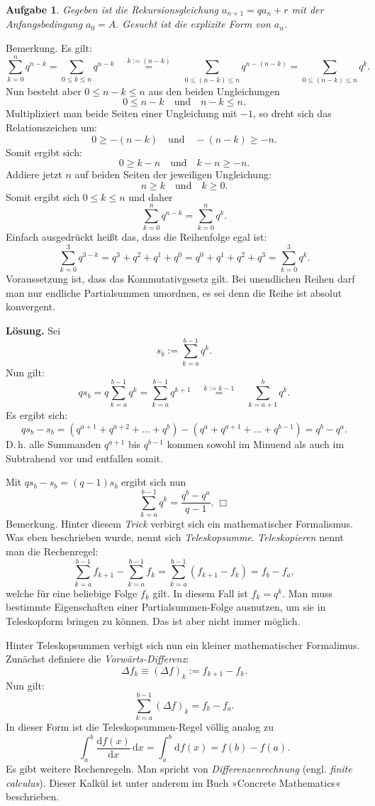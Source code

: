 \documentclass[a4paper,10pt,fleqn,twoside]{scrartcl}
\numberwithin{equation}{section}
\newcommand{\strong}[1]{{\sf\bfseries #1}}
\theoremstyle{Aufgabe}
\newtheorem{Aufgabe}{\sffamily Aufgabe}[section]
\begin{document}
\begin{Aufgabe}
Gegeben ist die Rekursionsgleichung
$a_{n+1} = qa_n+r$
mit der Anfangsbedingung
$a_0=A.$
Gesucht ist die explizite Form von $a_n$.
\end{Aufgabe}

\noindent
Bemerkung. Es gilt:
\[\sum_{k=0}^n q^{n-k} = \sum_{0\le k\le n} q^{n-k}
\quad\stackrel{k:=(n-k)}=\quad\sum_{0\le (n-k)\le n} q^{n-(n-k)}
= \sum_{0\le (n-k)\le n} q^k.
\]
Nun besteht aber $0\le n-k\le n$ aus den beiden Ungleichungen
\[0\le n-k\quad\text{und}\quad n-k\le n.\]
Multipliziert man beide Seiten einer Ungleichung mit $-1$, so dreht
sich das Relationszeichen um:
\[0\ge -(n-k)\quad\text{und}\quad -(n-k)\ge -n.\]
Somit ergibt sich:
\[0\ge k-n\quad\text{und}\quad k-n\ge -n.\]
Addiere jetzt $n$ auf beiden Seiten der jeweiligen Ungleichung:
\[n\ge k\quad\text{und}\quad k\ge 0.\]
Somit ergibt sich $0\le k\le n$ und daher
\[\sum_{k=0}^n q^{n-k} = \sum_{k=0}^n q^k.\]
Einfach ausgedrückt heißt das, dass die Reihenfolge egal ist:
\[\sum_{k=0}^3 q^{3-k} = q^3+q^2+q^1+q^0 = q^0+q^1+q^2+q^3 = \sum_{k=0}^3 q^k.\]
Voraussetzung ist, dass das Kommutativgesetz gilt. Bei unendlichen
Reihen darf man nur endliche Partialsummen umordnen, es sei denn
die Reihe ist absolut konvergent.

\strong{Lösung.} Sei
\[s_b := \sum_{k=a}^{b-1} q^k.\]
Nun gilt:
\[qs_b = q\sum_{k=a}^{b-1} q^k = \sum_{k=a}^{b-1} q^{k+1}
\quad\stackrel{k:=k-1}=\quad\sum_{k=a+1}^b q^k.\]
Es ergibt sich:
\[qs_b-s_b = (q^{a+1}+q^{a+2}+\ldots+q^{b})-(q^a+q^{a+1}+\ldots+q^{b-1}) = q^b-q^a.\]
D.\,h. alle Summanden $q^{a+1}$ bis $q^{b-1}$ kommen sowohl im Minuend als auch im Subtrahend vor und
entfallen somit.

Mit $qs_b-s_b=(q-1)s_b$ ergibt sich nun
\[\sum_{k=a}^{b-1} q^k = \frac{q^b-q^a}{q-1}.\;\Box\]
Bemerkung. Hinter diesem \emph{Trick} verbirgt sich ein mathematischer
Formalismus. Was eben beschrieben wurde, nennt sich
\emph{Teleskopsumme}. \emph{Teleskopieren} nennt man die Rechenregel:
\[\sum_{k=a}^{b-1} f_{k+1} - \sum_{k=a}^{b-1} f_k
= \sum_{k=a}^{b-1} (f_{k+1}-f_k) = f_b-f_a,\]
welche für eine beliebige Folge $f_k$ gilt. In diesem Fall ist
$f_k=q^k$. Man muss bestimmte Eigenschaften einer Partialsummen-Folge
ausnutzen, um sie in Teleskopform bringen zu können. Das ist aber nicht
immer möglich.

Hinter Teleskopsummen verbigt sich nun ein kleiner mathematischer
Formalimus. Zunächst definiere die \emph{Vorwärts-Differenz}:
\[\Delta f_k\equiv (\Delta f)_k := f_{k+1}-f_k.\]
Nun gilt:
\[\sum_{k=a}^{b-1} (\Delta f)_k = f_b-f_a.\]
In dieser Form ist die Teleskopsummen-Regel völlig analog zu
\[\int_a^b \frac{\mathrm df(x)}{\mathrm dx}\,\mathrm dx
= \int_a^b \mathrm df(x) = f(b)-f(a).\]
Es gibt weitere Rechenregeln. Man spricht von \emph{Differenzenrechnung}
(engl. \emph{finite calculus}). Dieser Kalkül ist unter anderem
im Buch »Concrete Mathematics« beschrieben.
\end{document}
